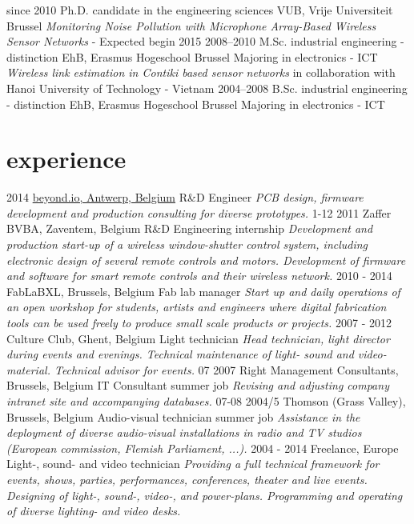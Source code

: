 \documentclass[]{friggeri-cv}
\begin{document}
\begin{entrylist}
  \entry
    {since 2010}
    {Ph.D. {\normalfont candidate in the engineering sciences}}
    {VUB, Vrije Universiteit Brussel}
    {\emph{Monitoring Noise Pollution with Microphone Array-Based Wireless Sensor Networks} - Expected begin 2015}
  \entry
    {2008–2010}
    {M.Sc. {\normalfont industrial engineering - distinction}}
    {EhB, Erasmus Hogeschool Brussel}
    {Majoring in electronics - ICT\\
    \emph{Wireless link estimation in Contiki based sensor networks} in collaboration with Hanoi University of Technology - Vietnam}
  \entry
    {2004–2008}
    {B.Sc. {\normalfont industrial engineering - distinction}}
    {EhB, Erasmus Hogeschool Brussel}
    {Majoring in electronics - ICT}
\end{entrylist}

\section{experience}

\begin{entrylist}
  \entry
    {2014}
    {\href{http://beyond.io}{beyond.io, Antwerp, Belgium}}
    {R\&D Engineer}
    {\emph{PCB design, firmware development and production consulting for diverse prototypes.}}
  \entry
    {1-12 2011}
    {Zaffer BVBA, Zaventem, Belgium}
    {R\&D Engineering internship}
    {\emph{Development and production start-up of a wireless window-shutter control system, including electronic design of several remote controls and motors. Development of firmware and software for smart remote controls and their wireless network.}}
  \entry
    {2010 - 2014}
    {FabLaBXL, Brussels, Belgium}
    {Fab lab manager}
    {\emph{Start up and daily operations of an open workshop for students, artists and engineers where digital fabrication tools can be used freely to produce small scale products or projects.}}
  \entry
    {2007 - 2012}
    {Culture Club, Ghent, Belgium}
    {Light technician}
    {\emph{Head technician, light director during events and evenings. Technical maintenance of light- sound and video-material. Technical advisor for events.}}
  \entry
    {07 2007}
    {Right Management Consultants, Brussels, Belgium}
    {IT Consultant summer job}
    {\emph{Revising and adjusting company intranet site and accompanying databases.}}
  \entry
    {07-08 2004/5}
    {Thomson (Grass Valley), Brussels, Belgium}
    {Audio-visual technician summer job}
    {\emph{Assistance in the deployment of diverse audio-visual installations in radio and TV studios (European commission, Flemish Parliament, ...).}}
  \entry
    {2004 - 2014}
    {Freelance, Europe}
    {Light-, sound- and video technician}
    {\emph{Providing a full technical framework for events, shows, parties, performances, conferences, theater and live events. Designing of light-, sound-, video-, and power-plans. Programming and operating of diverse lighting- and video desks. 
    }}
\end{entrylist}
\end{document}
